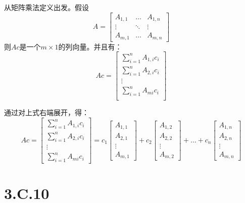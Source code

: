 \documentclass[10pt,a4paper,UTF8]{article}
\begin{document}
\begin{answer}
从矩阵乘法定义出发。假设
\begin{equation}
\label{eq:5}
A = 
\begin{bmatrix}
A_{1,1} & \ldots & A_{1,n} \\
\vdots & \ddots & \vdots \\
A_{m,1} & \ldots & A_{m,n}
\end{bmatrix}
\end{equation}
则\(Ac\)是一个\(m\times 1\)的列向量。并且有：
\begin{equation}
\label{eq:6}
Ac =
\begin{bmatrix}
\sum_{i=1}^{n}A_{1,i}c_{i} \\
\sum_{i=1}^{n}A_{2,i}c_{i} \\
\vdots \\
\sum_{i=1}^{n}A_{mi}c_{i} \\
\end{bmatrix}
\end{equation}

通过对上式右端展开，得：
\begin{equation*}
Ac =
\begin{bmatrix}
\sum_{i=1}^{n}A_{1,i}c_{i} \\
\sum_{i=1}^{n}A_{2,i}c_{i} \\
\vdots \\
\sum_{i=1}^{n}A_{mi}c_{i} 
\end{bmatrix}
= 
c_{1} 
\begin{bmatrix}
A_{1,1} \\ A_{2,1} \\ \vdots \\A_{m,1}
\end{bmatrix}
+
c_{2} 
\begin{bmatrix}
A_{1,2} \\ A_{2,2} \\ \vdots \\A_{m,2}
\end{bmatrix}
+ 
\ldots 
+
c_{n} 
\begin{bmatrix}
A_{1,n} \\ A_{2,n} \\ \vdots \\A_{m,n}
\end{bmatrix}
\end{equation*}
\end{answer}

\section{3.C.10}
\label{sec:org28aed9e}
\end{document}
